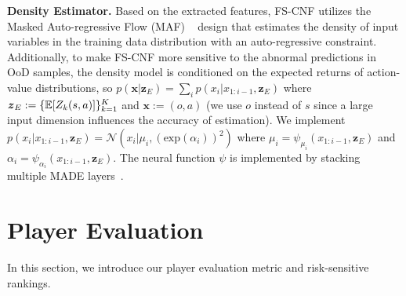 \documentclass{article}
\newcommand{\modelParamter}{\omega}
\newcommand{\datapoint}{x}
\newcommand{\condition}{\boldsymbol{z}_{E}}
\newcommand{\state}{s}
\newcommand{\observation}{o}
\newcommand{\action}{a}
\newcommand{\agentIndex}{k}
\newcommand{\dataset}{\mathcal{D}}
\newcommand{\expect}{\mathbb{E}}
\newcommand{\feature}{e}
\newcommand{\splitnum}{m}
\begin{document}
\noindent\textbf{Density Estimator.} Based on the extracted features, FS-CNF utilizes the Masked Auto-regressive Flow (MAF)
~\cite{Papamakarios2017MAF} design that estimates the density of input variables in the training data distribution with an auto-regressive constraint. Additionally, to make FS-CNF more sensitive to the abnormal predictions in OoD samples, the density model is conditioned on the expected returns of action-value distributions, so $p(\boldsymbol{\datapoint}|{\condition})=\sum_{i}p(\datapoint_{i}|\datapoint_{1:i-1},{\condition})$  where ${\condition}:=\{\expect[Z_{\agentIndex}(\state,\action)]\}_{\agentIndex=1}^{\MakeUppercase{\agentIndex}}$ and $\boldsymbol{\datapoint}:=(\observation,\action)$ (we use $\observation$ instead of $\state$ since a large input dimension influences the accuracy of estimation). We implement $p(\datapoint_{i}|\datapoint_{1:i-1},\condition)=\mathcal{N}(\datapoint_{i}|\mu_{i},(\text{exp}(\alpha_{i}))^{2})$ where $\mu_{i}=\psi_{\mu_{i}}(\datapoint_{1:i-1},\condition)$ and $\alpha_{i} = \psi_{\alpha_{i}}(\datapoint_{1:i-1},\condition)$. The neural function $\psi$ is implemented by stacking multiple MADE layers~\cite{Dias2020NFAnomaly}.

\vspace{-0.05in}
\section{Player Evaluation}\label{Sec:player-evaluation}
\vspace{-0.05in}
In this section, we introduce our player evaluation metric and risk-sensitive rankings.
\vspace{-0.05in}
\end{document}
